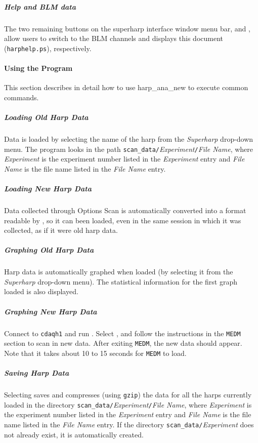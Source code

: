 	\subparagraph{Help and BLM data}

The two remaining buttons on the superharp interface window menu bar,  and
, allow users to switch to the BLM channels and displays this document ({\tt harphelp.ps}),
respectively.

\paragraph{Using the Program}\label{program}

This section describes in detail how to use harp\_ana\_new to execute common commands.

	\subparagraph{Loading Old Harp Data}

Data is loaded by selecting the name of the harp from the {\it Superharp} drop-down menu.  The program
looks in the path {\tt scan\_data/}{\it Experiment}{\tt /}{\it File Name}, where {\it Experiment} is
the experiment number listed in the {\it Experiment} entry and {\it File Name} is the file name listed
in the {\it File Name} entry.

	\subparagraph{Loading New Harp Data}

Data collected through Options Scan is automatically converted into a format readable by
{}, so it can been loaded, even in the same session in which it was collected,
as if it were old harp data.

	\subparagraph{Graphing Old Harp Data}

Harp data is automatically graphed when loaded (by selecting it from the {\it Superharp} drop-down menu).
The statistical information for the first graph loaded is also displayed.

	\subparagraph{Graphing New Harp Data}

Connect to {\tt cdaqh1} and run .  Select , and follow the
instructions in the {\tt MEDM} section to scan in new data.  After exiting {\tt MEDM}, the new data should
appear. Note that it takes about 10 to 15 seconds for {\tt MEDM} to load.

	\subparagraph{Saving Harp Data}

Selecting  saves and compresses (using {\tt gzip}) the data for all the harps
currently loaded in the directory {\tt scan\_data/}{\it Experiment}{\tt /}{\it File Name}, where
{\it Experiment} is the experiment number listed in the {\it Experiment} entry and {\it File Name}
is the file name listed in the {\it File Name} entry.  If the directory {\tt scan\_data/}{\it Experiment}
does not already exist, it is automatically created.

